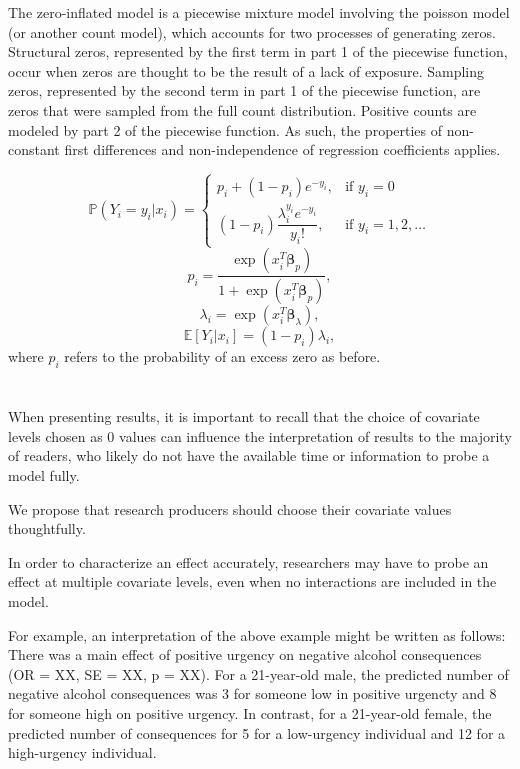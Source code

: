 \documentclass[jou, apacite]{apa6}
\begin{document}
The zero-inflated model is a piecewise mixture model involving the poisson model (or another count model), which accounts for two processes of generating zeros. Structural zeros, represented by the first term in part 1 of the piecewise function, occur when zeros are thought to be the result of a lack of exposure. Sampling zeros, represented by the second term in part 1 of the piecewise function, are zeros that were sampled from the full count distribution. Positive counts are modeled by part 2 of the piecewise function. As such, the properties of non-constant first differences and non-independence of regression coefficients applies. 

\begin{equation} \label{zip1}
\mathbb{P}(Y_i = y_i|x_i) =
  \begin{cases}
    p_i + (1 - p_i)e^{-y_i}, & \text{if } y_i = 0 \\
    (1 - p_i) \dfrac{\lambda_i^{y_i}e^{-y_i}}{y_i!}, & \text{if } y_i = 1, 2, \dots
  \end{cases}
\end{equation}
\begin{equation} \label{zip2}
p_i = \dfrac{\exp (x_i^T \bm{\beta}_{p})}{1 + \exp (x_i^T \bm{\beta}_{p})},
\end{equation}
\begin{equation} \label{zip3}
\lambda_i = \exp (x_i^T \bm{\beta}_{\lambda}),
\end{equation}
\begin{equation} \label{zip4}
\mathbb{E}[Y_i|x_i] = (1 - p_i)\lambda_i,
\end{equation}
where $p_i$ refers to the probability of an excess zero as before.


\section{}
When presenting results, it is important to recall that the choice of covariate levels chosen as 0 values can influence the interpretation of results to the majority of readers, who likely do not have the available time or information to probe a model fully. 

We propose that research producers should choose their covariate values thoughtfully. 

In order to characterize an effect accurately, researchers may have to probe an effect at multiple covariate levels, even when no interactions are included in the model.

For example, an interpretation of the above example might be written as follows: There was a main effect of positive urgency on negative alcohol consequences (OR = XX, SE = XX, p = XX). For a 21-year-old male, the predicted number of negative alcohol consequences was 3 for someone low in positive urgencty and 8 for someone high on positive urgency. In contrast, for a 21-year-old female, the predicted number of consequences for 5 for a low-urgency individual and 12 for a high-urgency individual.
\end{document}
